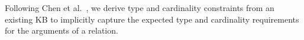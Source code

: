 

Following Chen et al.~, we derive type and cardinality constraints from an existing KB to implicitly capture the expected type and cardinality requirements for the arguments of a relation. 
